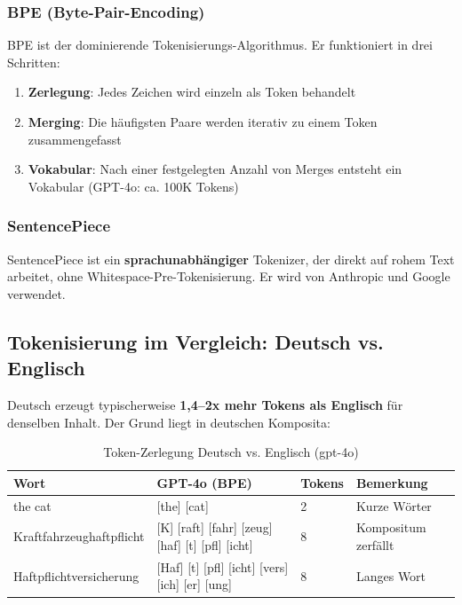 \subsubsection{BPE (Byte-Pair-Encoding)}

BPE ist der dominierende Tokenisierungs-Algorithmus. Er funktioniert in drei Schritten:
\begin{enumerate}[leftmargin=*]
    \item \textbf{Zerlegung}: Jedes Zeichen wird einzeln als Token behandelt
    \item \textbf{Merging}: Die häufigsten Paare werden iterativ zu einem Token zusammengefasst
    \item \textbf{Vokabular}: Nach einer festgelegten Anzahl von Merges entsteht ein Vokabular (GPT-4o: ca. 100K Tokens)
\end{enumerate}

\subsubsection{SentencePiece}

SentencePiece ist ein \textbf{sprachunabhängiger} Tokenizer, der direkt auf rohem Text arbeitet, ohne Whitespace-Pre-Tokenisierung. Er wird von Anthropic und Google verwendet.

\subsection{Tokenisierung im Vergleich: Deutsch vs. Englisch}

Deutsch erzeugt typischerweise \textbf{1,4--2x mehr Tokens als Englisch} für denselben Inhalt. Der Grund liegt in deutschen Komposita:

\begin{table}[H]
\centering
\begin{tabularx}{\linewidth}{lXXX}
\toprule
\textbf{Wort} & \textbf{GPT-4o (BPE)} & \textbf{Tokens} & \textbf{Bemerkung} \\
\midrule
the cat & [the] [cat] & 2 & Kurze Wörter \\
Kraftfahrzeughaftpflicht & [K] [raft] [fahr] [zeug] [haf] [t] [pfl] [icht] & 8 & Kompositum zerfällt \\
Haftpflichtversicherung & [Haf] [t] [pfl] [icht] [vers] [ich] [er] [ung] & 8 & Langes Wort \\
\midrule
\end{tabularx}
\caption{Token-Zerlegung Deutsch vs. Englisch (gpt-4o)}
\label{tab:token-deutsch}
\end{table}

